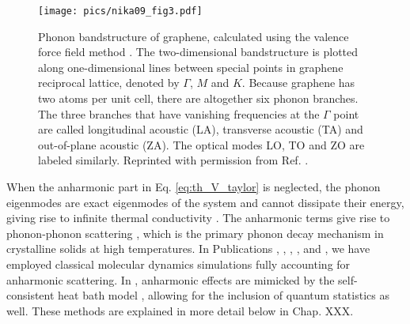 \begin{figure}
\begin{center}
 \texttt{[image: pics/nika09\_fig3.pdf]}
 \caption{Phonon bandstructure of graphene, calculated using the valence force field method \cite{nika09}. The two-dimensional bandstructure is plotted along one-dimensional lines between special points in graphene reciprocal lattice, denoted by $\Gamma$, $M$ and $K$. Because graphene has two atoms per unit cell, there are altogether six phonon branches. The three branches that have vanishing frequencies at the $\Gamma$ point are called longitudinal acoustic (LA), transverse acoustic (TA) and out-of-plane acoustic (ZA). The optical modes LO, TO and ZO are labeled similarly. Reprinted with permission from Ref. \cite{nika09}.}
\label{fig:th_nika}
\end{center}
\end{figure} 

When the anharmonic part in Eq. \eqref{eq:th_V_taylor} is neglected, the phonon eigenmodes are exact eigenmodes of the system and cannot dissipate their energy, giving rise to infinite thermal conductivity \cite{ziman}. The anharmonic terms give rise to phonon-phonon scattering \cite{ziman}, which is the primary phonon decay mechanism in crystalline solids at high temperatures. In Publications , , , , and , we have employed classical molecular dynamics simulations fully accounting for anharmonic scattering. In , anharmonic effects are mimicked by the self-consistent heat bath model \cite{bolsterli70}, allowing for the inclusion of quantum statistics as well. These methods are explained in more detail below in Chap. XXX.









